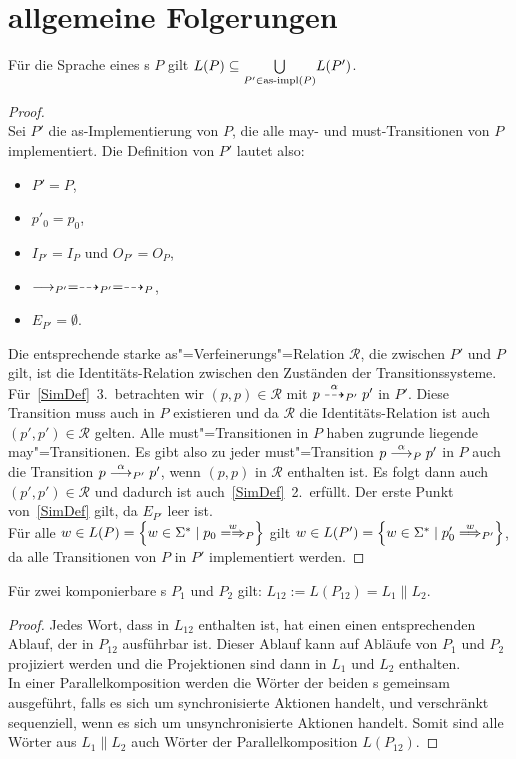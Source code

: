 \section{allgemeine Folgerungen}

\begin{Prop}
  \label{LImpProp}
  Für die Sprache eines \MEIO{}s $P$ gilt $L(P) \subseteq \underset{P'\in\mathrm{as}\text{-}\mathrm{impl}
  (P)}{\bigcup} L(P')$.
\end{Prop}
\begin{proof}\mbox{}\\
  Sei $P'$ die as-Implementierung von $P$, die alle may- und must-Transitionen
  von $P$ implementiert. Die Definition von $P'$ lautet also:
  \begin{itemize}
    \item $P'=P$,
    \item $p'_0=p_0$,
    \item $I_{P'}=I_P$ und $O_{P'}=O_P$,
    \item $\must _{P'} =\may _{P'} = \may _P$,
    \item $E_{P'}=\emptyset$.
  \end{itemize}
  Die entsprechende starke as"=Verfeinerungs"=Relation $\mathcal{R}$, die
  zwischen $P'$ und $P$ gilt, ist die Identitäts-Relation zwischen den
  Zuständen der Transitionssysteme. Für~\ref{SimDef}~3.\ betrachten wir $(p,p)
  \in\mathcal{R}$ mit $p\may[\alpha]_{P'} p'$ in $P'$. Diese Transition muss
  auch in $P$ existieren und da $\mathcal{R}$ die Identitäts-Relation ist auch
  $(p',p')\in\mathcal{R}$ gelten. Alle must"=Transitionen in $P$ haben zugrunde
  liegende may"=Transitionen. Es gibt also zu jeder must"=Transition $p
  \must[\alpha]_P p'$ in $P$ auch die Transition $p\must[\alpha]_{P'} p'$, wenn
  $(p,p)$ in $\mathcal{R}$ enthalten ist. Es folgt dann auch $(p',p') \in
  \mathcal{R}$ und dadurch ist auch~\ref{SimDef}~2.\ erfüllt. Der erste Punkt
  von~\ref{SimDef} gilt, da $E_{P'}$ leer ist.\\
  Für alle $w\in L(P) = \left\{w\in \Sigma ^* \mid p_0\weakmay[w]_P\right\}$
  gilt $w\in L(P') = \left\{w\in \Sigma ^* \mid p'_0 \weakmust[w]_{P'}
  \right\}$, da alle Transitionen von $P$ in $P'$ implementiert werden.
\end{proof}

\begin{Prop}
  \label{LParallelProp}
  Für zwei komponierbare \MEIO{}s $P_1$ und $P_2$ gilt: $L_{12} := L(P_{12}) =
  L_1\|L_2$.
\end{Prop}
\begin{proof}
  Jedes Wort, dass in $L_{12}$ enthalten ist, hat einen einen entsprechenden
  Ablauf, der in $P_{12}$ ausführbar ist. Dieser Ablauf kann auf Abläufe von
  $P_1$ und $P_2$ projiziert werden und die Projektionen sind dann in $L_1$ und
  $L_2$ enthalten.\\
  In einer Parallelkomposition werden die Wörter der beiden \MEIO{}s gemeinsam
  ausgeführt, falls es sich um synchronisierte Aktionen handelt, und
  verschränkt sequenziell, wenn es sich um unsynchronisierte Aktionen handelt.
  Somit sind alle Wörter aus $L_1\|L_2$ auch Wörter der Parallelkomposition
  $L(P_{12})$.
\end{proof}

